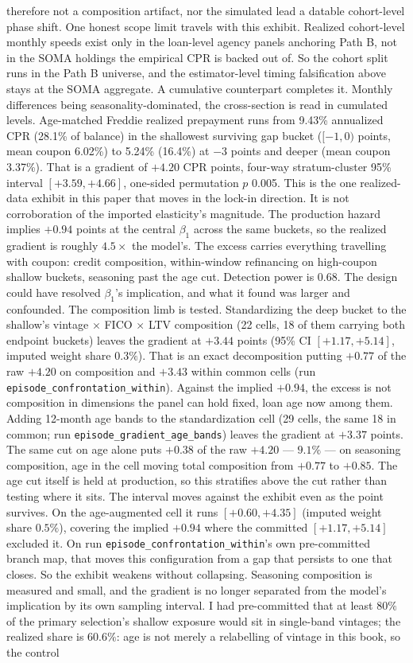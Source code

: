 \documentclass[12pt]{article}
\begin{document}
therefore not a composition artifact, nor the simulated lead a datable cohort-level phase shift. One honest scope limit travels with this exhibit. Realized cohort-level monthly speeds exist only in the loan-level agency panels anchoring Path B, not in the SOMA holdings the empirical CPR is backed out of. So the cohort split runs in the Path B universe, and the estimator-level timing falsification above stays at the SOMA aggregate. A cumulative counterpart completes it. Monthly differences being seasonality-dominated, the cross-section is read in cumulated levels. Age-matched Freddie realized prepayment runs from 9.43\% annualized CPR (28.1\% of balance) in the shallowest surviving gap bucket ($[-1,0)$ points, mean coupon 6.02\%) to 5.24\% (16.4\%) at $-3$ points and deeper (mean coupon 3.37\%). That is a gradient of $+4.20$ CPR points, four-way stratum-cluster 95\% interval $[+3.59, +4.66]$, one-sided permutation $p$ 0.005. This is the one realized-data exhibit in this paper that moves in the lock-in direction. It is not corroboration of the imported elasticity's magnitude. The production hazard implies $+0.94$ points at the central $\beta_1$ across the same buckets, so the realized gradient is roughly $4.5\times$ the model's. The excess carries everything travelling with coupon: credit composition, within-window refinancing on high-coupon shallow buckets, seasoning past the age cut. Detection power is 0.68. The design could have resolved $\beta_1$'s implication, and what it found was larger and confounded. The composition limb is tested. Standardizing the deep bucket to the shallow's vintage $\times$ FICO $\times$ LTV composition (22 cells, 18 of them carrying both endpoint buckets) leaves the gradient at $+3.44$ points (95\% CI $[+1.17, +5.14]$, imputed weight share $0.3\%$). That is an exact decomposition putting $+0.77$ of the raw $+4.20$ on composition and $+3.43$ within common cells (run \texttt{episode\_confrontation\_within}). Against the implied $+0.94$, the excess is not composition in dimensions the panel can hold fixed, loan age now among them. Adding 12-month age bands to the standardization cell (29 cells, the same 18 in common; run \texttt{episode\_gradient\_age\_bands}) leaves the gradient at $+3.37$ points. The same cut on age alone puts $+0.38$ of the raw $+4.20$ --- $9.1\%$ --- on seasoning composition, age in the cell moving total composition from $+0.77$ to $+0.85$. The age cut itself is held at production, so this stratifies above the cut rather than testing where it sits. The interval moves against the exhibit even as the point survives. On the age-augmented cell it runs $[+0.60, +4.35]$ (imputed weight share $0.5\%$), covering the implied $+0.94$ where the committed $[+1.17, +5.14]$ excluded it. On run \texttt{episode\_confrontation\_within}'s own pre-committed branch map, that moves this configuration from a gap that persists to one that closes. So the exhibit weakens without collapsing. Seasoning composition is measured and small, and the gradient is no longer separated from the model's implication by its own sampling interval. I had pre-committed that at least $80\%$ of the primary selection's shallow exposure would sit in single-band vintages; the realized share is $60.6\%$: age is not merely a relabelling of vintage in this book, so the control 
\end{document}
